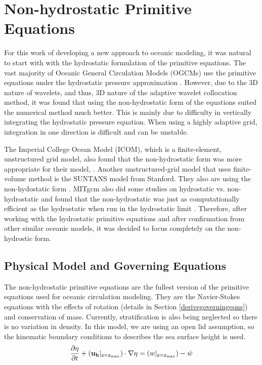 \chapter[Non-Hydrostatic Primitive Equations]{Non-hydrostatic Primitive Equations}
\label{chapter:5}

For this work of developing a new approach to oceanic modeling, it was natural to start with with the hydrostatic formulation of the primitive equations.  The vast majority of Oceanic General Circulation Models (OGCMs) use the primitive equations under the hydrostatic pressure approximation \cite{96Mcw}.  However, due to the 3D nature of wavelets, and thus, 3D nature of the adaptive wavelet collocation method, it was found that using the non-hydrostatic form of the equations suited the numerical method much better.  This is mainly due to difficulty in vertically integrating the hydrostatic pressure equation.  When using a highly adaptive grid, integration in one direction is difficult and can be unstable.  

The Imperial College Ocean Model (ICOM), which is a finite-element, unstructured grid model, also found that the non-hydrostatic form was more appropriate for their model, \cite{07BCLDR}.  Another unstructured-grid model that uses finite-volume method is the SUNTANS model from Stanford.  They also are using the non-hydostatic form \cite{06FGS}.  MITgcm also did some studies on hydrostatic vs. non-hydrostatic and found that the non-hydrostatic was just as computationally efficient as the hydrostatic when run in the hydrostatic limit \cite{98MJH}.  Therefore, after working with the hydrostatic primitive equations and after confirmation from other similar oceanic models, it was decided to focus completely on the non-hydrostic form.

\section{Physical Model and Governing Equations}

The non-hydrostatic primitive equations are the fullest version of the primitive equations used for oceanic circulation modeling.  They are the Navier-Stokes equations with the effects of rotation (details in Section \ref{derivegoverningeqns}) and conservation of mass.  Currently, stratification is also being neglected so there is no variation in density.  In this model, we are using an open lid assumption, so the kinematic boundary conditions to describes the sea surface height is used.  
%
\begin{equation*}\label{e:nh_eta}
\frac{\partial \eta}{\partial t} + ({\bf u_h} |_{\rm z=z_{max}}) \cdot \nabla \eta  =  (w|_{\rm z=z_{max}}) - \bar{w}
\end{equation*}

